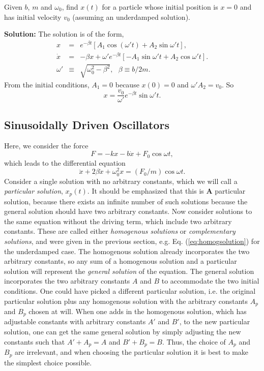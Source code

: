 \example
Given $b$, $m$ and $\omega_0$, find $x(t)$ for a particle whose initial position is $x=0$ and has initial velocity $v_0$ (assuming an underdamped solution).

{\bf Solution:} The solution is of the form,
\begin{eqnarray*}
x&=&e^{-\beta t}\left[A_1\cos(\omega' t)+A_2\sin\omega't\right],\\
\dot{x}&=&-\beta x+\omega'e^{-\beta t}\left[-A_1\sin\omega't+A_2\cos\omega't\right].\\
\omega'&\equiv&\sqrt{\omega_0^2-\beta^2},~~~\beta\equiv b/2m.
\end{eqnarray*}
From the initial conditions, $A_1=0$ because $x(0)=0$ and $\omega'A_2=v_0$. So 
\[
x=\frac{v_0}{\omega'}e^{-\beta t}\sin\omega't.
\]
\exampleend

\subsection{Sinusoidally Driven Oscillators}

Here, we consider the force
\begin{equation}
F=-kx-b\dot{x}+F_0\cos\omega t,
\end{equation}
which leads to the differential equation
\begin{equation}
\label{eq:drivenosc}
\ddot{x}+2\beta\dot{x}+\omega_0^2x=(F_0/m)\cos\omega t.
\end{equation}
Consider a single solution with no arbitrary constants, which we will call a {\it particular solution}, $x_p(t)$. It should be emphasized that this is {\bf A} particular solution, because there exists an infinite number of such solutions because the general solution should have two arbitrary constants. Now consider solutions to the same equation without the driving term, which include two arbitrary constants. These are called either {\it homogenous solutions} or {\it complementary solutions}, and were given in the previous section, e.g. Eq. (\ref{eq:homogsolution}) for the underdamped case. The homogenous solution already incorporates the two arbitrary constants, so any sum of a homogenous solution and a particular solution will represent the {\it general solution} of the equation. The general solution incorporates the two arbitrary constants $A$ and $B$ to accommodate the two initial conditions. One could have picked a different particular solution, i.e. the original particular solution plus any homogenous solution with the arbitrary constants $A_p$ and $B_p$ chosen at will. When one adds in the homogenous solution, which has adjustable constants with arbitrary constants $A'$ and $B'$, to the new particular solution, one can get the same general solution by simply adjusting the new constants such that $A'+A_p=A$ and $B'+B_p=B$. Thus, the choice of $A_p$ and $B_p$ are irrelevant, and when choosing the particular solution it is best to make the simplest choice possible.

